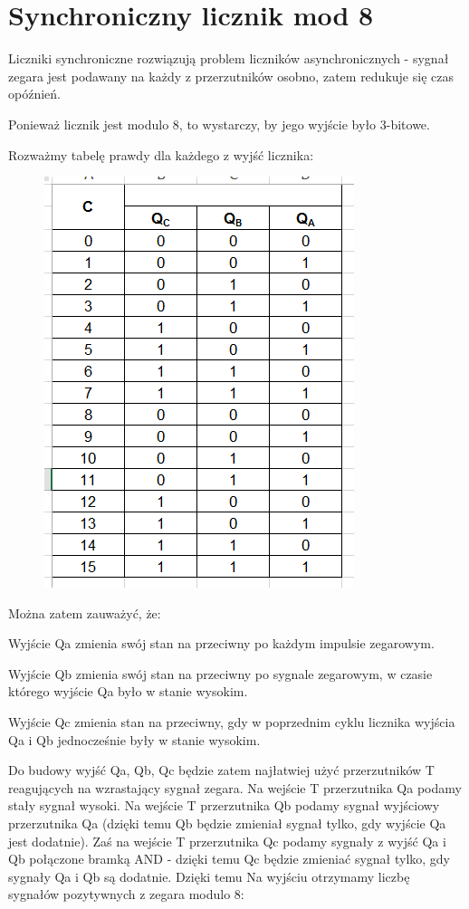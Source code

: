 \documentclass[12pt,a4paper]{article}
\begin{document}
\section{Synchroniczny licznik mod 8}

Liczniki synchroniczne rozwiązują problem liczników asynchronicznych - sygnał zegara jest podawany na każdy z przerzutników osobno, zatem redukuje się czas opóźnień.

Ponieważ licznik jest modulo 8, to wystarczy, by jego wyjście było 3-bitowe.

Rozważmy tabelę prawdy dla każdego z wyjść licznika:

\begin{figure}[H]
\centering
\includegraphics{img/4c_table}
\end{figure}

Można zatem zauważyć, że:
\par
Wyjście Qa zmienia swój stan na przeciwny po każdym impulsie zegarowym.
\par
Wyjście Qb zmienia swój stan na przeciwny po sygnale zegarowym, w czasie którego wyjście Qa było w stanie wysokim.
\par 
Wyjście Qc zmienia stan na przeciwny, gdy w poprzednim cyklu licznika wyjścia Qa i Qb jednocześnie były w stanie wysokim.
\par 

Do budowy wyjść Qa, Qb, Qc będzie zatem najłatwiej użyć przerzutników T reagujących na wzrastający sygnał zegara.
Na wejście T przerzutnika Qa podamy stały sygnał wysoki. Na wejście T przerzutnika Qb podamy sygnał wyjściowy przerzutnika Qa (dzięki temu Qb będzie zmieniał sygnał tylko, gdy wyjście Qa jest dodatnie). Zaś na wejście T przerzutnika Qc podamy sygnały z wyjść Qa i Qb połączone bramką AND - dzięki temu Qc będzie zmieniać sygnał tylko, gdy sygnały Qa i Qb są dodatnie. Dzięki temu Na wyjściu otrzymamy liczbę sygnałów pozytywnych z zegara modulo 8:
\end{document}
